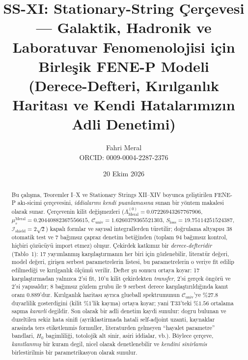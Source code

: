 \documentclass[12pt,a4paper]{article}
\title{\textbf{SS-XI: Stationary-String Çerçevesi --- Galaktik, Hadronik ve Laboratuvar Fenomenolojisi için Birleşik FENE-P Modeli} \\[0.3cm]
\large (Derece-Defteri, Kırılganlık Haritası ve Kendi Hatalarımızın Adli Denetimi)}
\author{Fahri Meral\\[0.2em]\small ORCID: 0009-0004-2287-2376}
\date{20 Ekim 2026}
\begin{document}
\shorthandoff{=}

\maketitle

\begin{abstract}
Bu çalışma, Teoremler I--X ve Stationary Strings XII--XIV boyunca geliştirilen
FENE-P akı-sicimi çerçevesini, \emph{iddialarını kendi puanlamasına} sunan
bir yöntem makalesi olarak sunar. Çerçevenin kilit değişmezleri
($\Lambda_{\mathrm{Meral}}^{(0)} = 0.07226943267767906$,
$\mu_s^{\mathrm{Meral}} = 0.20440882367556615$,
$\mathcal{C}_{\mathrm{univ}} = 1.6260379365521303$,
$S_{\mathrm{loss}} = 19.75114251524387$,
$\mathcal{I}_{\mathrm{shield}} = 2\sqrt{2}$) kapalı formlar ve sayısal
integrallerden türetilir; doğrulama altyapısı 38 otomatik test ve 7 bağımsız
çapraz denetim betiğinden (toplam 94 bağımsız kontrol, hiçbiri çözücüyü
import etmez) oluşur. Çekirdek katkımız bir \emph{derece-defteridir}
(Tablo~1): 17 yayımlanmış karşılaştırmanın her biri için gözlenebilir,
literatür değeri, model değeri, girişen serbest parametrelerin listesi, bu
parametrelerin o veriye fit edilip edilmediği ve kırılganlık ölçümü
verilir. Defter şu sonucu ortaya koyar: 17 karşılaştırmadan yalnızca
2'si fit, 10'u kilit çekirdekten \emph{transfer}, 2'si gerçek öngörü ve
2'si yapısaldır; 8 bağımsız gözlem grubu ile 9 serbest derece
karşılaştırıldığında kanıt oranı $0.889$'dur. Kırılganlık haritası ayrıca
glueball spektrumunun $\mathcal{C}_{\mathrm{univ}}$'ye $\%27.8$
duyarlilik gosterdigini (kilit $\%1$'lik kayma) ortaya koyar; yani
T33'teki $\%1.56$ ortalama sapma \emph{kararli} degildir. Son olarak bir
adli denetim kaydi sunulur: dogru bulunan ve duzeltilen sekiz hata sinifi
(ayriklastirmada hatali self-adjoint uzanti, kaynaklar arasinda ters
etiketlenmis formuller, literaturden gelmeyen ``hayalet parametre''
bandlari, $H_0$ bagimliliği, totolojik alt sinir, asiri iddialar, vb.).
Böylece çerçeve, \emph{kanıtlanmış} bir kuram degil, nicel olarak
denetlenebilir ve \emph{kendini sinirlamis} birlestirilmis bir
parametrikasyon olarak sunulur.
\end{abstract}
\end{document}
